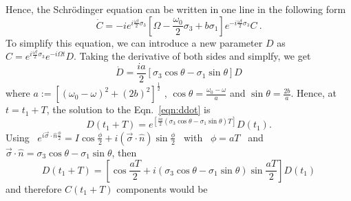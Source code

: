 Hence, the Schr\"{o}dinger equation can be written in one line in the following form
\begin{equation}
  \dot{C}= -i e^{ i \frac{\omega t}{2}\sigma_3} \left[\Omega - \frac{\omega_0}{2} \sigma_3+b \sigma_1\right] e^{-i\frac{\omega t}{2}\sigma_3} C~.
\end{equation}
To simplify this equation, we can introduce a new parameter $D$ as $C= e^{i \frac{\omega t}{2}\sigma_3} e^{-i \Omega t} D$. Taking the derivative of both sides and simplfy, we get
\begin{equation}
  \label{eqn:ddot}
\dot{D}=\frac{i a}{2}\left[ \sigma_3 \cos \theta - \sigma_1 \sin \theta \right] D
\end{equation}
where
$a:= {\left[{(\omega_0 - \omega)}^2+ {(2b)}^2\right]}^\frac{1}{2}$ ,
$\cos \theta = \frac{\omega_0 - \omega}{a}$ and
$\sin \theta=\frac{2b}{a}$. Hence, at $t = t_1+T$, the solution to the
Eqn.~\ref{eqn:ddot} is
\begin{equation}
D(t_1+T)= e^{\left[\frac{i a}{2}
\left( \sigma_3 \cos \theta
-\sigma_1\sin \theta 
\right) T 
\right]
}D(t_1).
\end{equation}
Using
~$ e^{i \vec{\sigma}\cdot\hat{n}\frac{\phi}{2}}= I \cos \frac{\phi}{2}+
i (\vec{\sigma}\cdot\hat{n})\sin \frac{\phi}{2}$ ~with~ $ \phi=aT$ ~and
~$\vec{\sigma}\cdot\hat{n}=\sigma_3 \cos \theta -\sigma_1 \sin \theta$,
then
\begin{equation}
D(t_1+T)= \left[\cos \frac{aT}{2}+i(\sigma_3 \cos \theta - \sigma_1 \sin \theta ) \sin \frac{aT}{2}\right] D(t_1)
\end{equation}
and therefore $C(t_1+T)$ components would be
